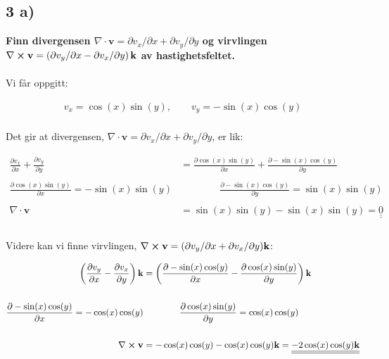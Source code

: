 \subsection*{3 a)}
\textbf{Finn divergensen $\nabla \cdot \textbf{v} = \partial v_x /\partial x
+  \partial v_y /\partial y$ og virvlingen $\nabla \cross \textbf{v} =
\left(\partial v_y /\partial x - \partial v_x /\partial y\right)\textbf{k}$
av hastighetsfeltet.}
\\
\\
Vi får oppgitt:

\begin{align*}
    v_x = \cos(x)\sin(y), \qquad v_y = - \sin(x)\cos(y)
    \\
\end{align*}

Det gir at divergensen, $\nabla \cdot \textbf{v} = \partial v_x /\partial x
+  \partial v_y /\partial y$, er lik:

\begin{align*}
    \frac{\partial v_x}{\partial x}
    +
    \frac{\partial v_y}{\partial y}
    &=
    \frac{\partial \cos(x)\sin(y)}{\partial x}
    +
    \frac{\partial - \sin(x)\cos(y)}{\partial y}
    \\
    \\
    \frac{\partial \cos(x)\sin(y)}{\partial x}
    =
     -\sin(x)\sin(y)
    &\qquad \qquad
    \frac{\partial - \sin(x)\cos(y)}{\partial y}
    =
    \sin(x)\sin(y)
    \\
    \\
    \nabla \cdot \textbf{v} &= \sin(x)\sin(y) - \sin(x)\sin(y)
    = \underline{\underline{0}}
    \\
    \\
\end{align*}

Videre kan vi finne virvlingen, $\nabla \cross \textbf{v} =
(\partial v_y /\partial x+  \partial v_x /\partial y) \textbf{k}$:


\begin{align*}
    \left(\frac{\partial v_y}{\partial x}
    -
    \frac{\partial v_x}{\partial y}\right) \textbf{k}
    &=
    \left(\frac{\partial -\sin(x)\cos(y)}{\partial x}
    -
    \frac{\partial \cos(x)\sin(y)}{\partial y}\right) \textbf{k}
    \\
    \\
    \frac{\partial - \sin(x)\cos(y)}{\partial x}
    =
     -\cos(x)\cos(y)
    &\qquad \qquad
    \frac{\partial \cos(x)\sin(y)}{\partial y}
    =
    \cos(x) \cos(y)
    \\
    \\
    \nabla \cross \textbf{v}
    &=
    -\cos(x)\cos(y) - \cos(x)\cos(y)\textbf{k}
    =
    \underline{\underline{-2\cos(x)\cos(y)\textbf{k}}}
\end{align*}










